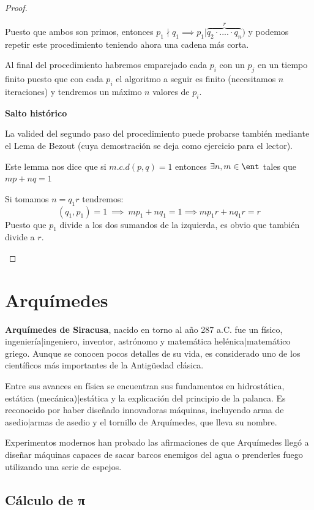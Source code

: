 \documentclass{apuntes}
\begin{document}
\begin{proof}
\begin{enumerate}
\begin{enumerate}
Puesto que ambos son primos, entonces $p_1 \nmid q_1 \implies p_1 | \overbrace{q_2\cdot .... \cdot q_n}^r)$ y podemos repetir este procedimiento teniendo ahora una cadena más corta.
\end{enumerate}

Al final del procedimiento habremos emparejado cada $p_i$ con un $p_j$ en un tiempo finito puesto que con cada $p_i$ el algoritmo a seguir es finito (necesitamos $n$ iteraciones) y tendremos un máximo $n$ valores de $p_i$.

\begin{mdframed}
\textbf{Salto histórico}

La valided del segundo paso del procedimiento puede probarse también mediante el Lema de Bezout (cuya demostración se deja como ejercicio para el lector).

Este lemma nos dice que si $m.c.d(p,q)=1$ entonces $\exists n,m\in \ent $ tales que $mp+nq =1$

Si tomamos $n=q_1r$ tendremos:
\[(q_1,p_1) = 1 \ \implies \ mp_1+nq_1 = 1 \implies mp_1r +nq_1r = r\]
Puesto que $p_1$ divide a los dos sumandos de la izquierda, es obvio que también divide a $r$.
\end{mdframed}
\end{enumerate}
\end{proof}

\section{Arquímedes}
\textbf{Arquímedes de Siracusa}, nacido en torno al año 287 a.C. fue un físico, ingeniería|ingeniero, inventor, astrónomo y matemática helénica|matemático griego. Aunque se conocen pocos detalles de su vida, es considerado uno de los científicos más importantes de la Antigüedad clásica. 

Entre sus avances en física se encuentran sus fundamentos en hidrostática, estática (mecánica)|estática y la explicación del principio de la palanca. Es reconocido por haber diseñado innovadoras máquinas, incluyendo arma de asedio|armas de asedio y el tornillo de Arquímedes, que lleva su nombre. 

Experimentos modernos han probado las afirmaciones de que Arquímedes llegó a diseñar máquinas capaces de sacar barcos enemigos del agua o prenderles fuego utilizando una serie de espejos. 


\subsection{Cálculo de π}
\end{document}
